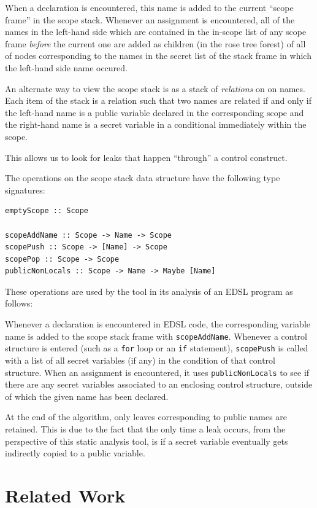 \documentclass[10pt, conference]{IEEEtran}
\newcommand{\ttt}{\texttt}
\begin{document}
When a declaration is encountered, this name is added to the current ``scope
frame'' in the scope stack. Whenever an assignment is encountered, all of the
names in the left-hand side which are contained in the in-scope list of any
scope frame \textit{before} the current one are added as children (in the rose
tree forest) of all of nodes corresponding to the names in the secret list of
the stack frame in which the left-hand side name occured.

An alternate way to view the scope stack is as a stack of \textit{relations} on
on names. Each item of the stack is a relation such that two names are related
if and only if the left-hand name is a public variable declared in the corresponding
scope and the right-hand name is a secret variable in a conditional immediately within the scope.

This allows us to look for leaks that happen ``through'' a control construct.

The operations on the scope stack data structure have the following type signatures:

\begin{lstlisting}
emptyScope :: Scope

scopeAddName :: Scope -> Name -> Scope
scopePush :: Scope -> [Name] -> Scope
scopePop :: Scope -> Scope
publicNonLocals :: Scope -> Name -> Maybe [Name]
\end{lstlisting}

\noindent These operations are used by the tool in its analysis of an EDSL
program as follows:

Whenever a declaration is encountered in EDSL code, the corresponding variable
name is added to the scope stack frame with \ttt{scopeAddName}. Whenever a control
structure is entered (such as a \ttt{for} loop or an \ttt{if} statement),
\ttt{scopePush} is called with a list of all secret variables (if any) in the
condition of that control structure. When an assignment is encountered, it
uses \ttt{publicNonLocals} to see if there are any secret variables associated
to an enclosing control structure, outside of which the given name has been declared.

At the end of the algorithm, only leaves corresponding to public names are
retained. This is due to the fact that the only time a leak occurs, from the
perspective of this static analysis tool, is if a secret variable eventually
gets indirectly copied to a public variable.


\section{Related Work}
\label{sec:RelatedWork}
\end{document}
